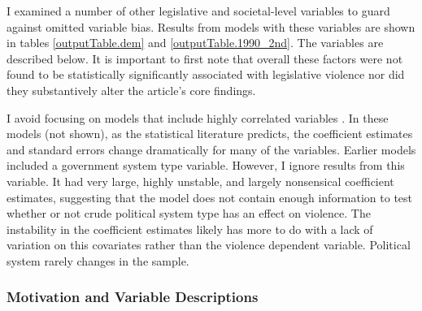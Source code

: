 \documentclass[a4paper]{article}\usepackage[]{graphicx}\usepackage[]{color}
\begin{document}

I examined a number of other legislative and societal-level variables to guard against omitted variable bias. Results from models with these variables are shown in tables \ref{outputTable.dem} and \ref{outputTable.1990_2nd}. The variables are described below. It is important to first note that overall these factors were not found to be statistically significantly associated with legislative violence nor did they substantively alter the article's core findings.

I avoid focusing on models that include highly correlated variables \citep[]{Achen2002, Schrodt2006}. In these models (not shown), as the statistical literature predicts, the coefficient estimates and standard errors change dramatically for many of the variables. Earlier models included a government system type variable. However, I ignore results from this variable. It had very large, highly unstable, and largely nonsensical coefficient estimates, suggesting that the model does not contain enough information to test \citep{Babyak2004} whether or not crude political system type has an effect on violence. The instability in the coefficient estimates likely has more to do with a lack of variation on this covariates rather than the violence dependent variable. Political system rarely changes in the sample.

\subsubsection*{Motivation and Variable Descriptions}

\end{document}
